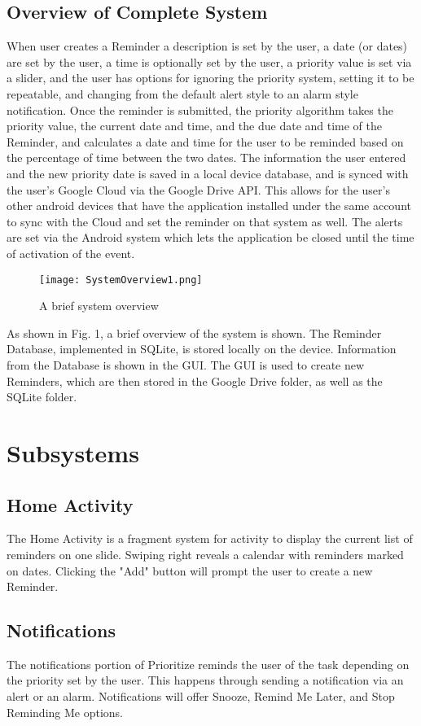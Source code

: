 \documentclass[12pt]{article}
\begin{document}
\subsection{Overview of Complete System}
When user creates a Reminder a description is set by the user, a date (or dates)  are set by the user, a time is optionally set by the user, a priority value is set via a slider, and the user has options for ignoring the priority system, setting it to be repeatable, and changing from the default alert style to an alarm style notification. Once the reminder is submitted, the priority algorithm takes the priority value, the current date and time, and the due date and time of the Reminder, and calculates a date and time for the user to be reminded based on the percentage of time between the two dates. The information the user entered and the new priority date is saved in a local device database, and is synced with the user's Google Cloud via the Google Drive API. This allows for the user's other android devices that have the application installed under the same account to sync with the Cloud and set the reminder on that system as well. The alerts are set via the Android system which lets the application be closed until the time of activation of the event.

\begin{figure}[h]
\texttt{[image: SystemOverview1.png]}
\centering
\caption{A brief system overview}
\end{figure}

As shown in Fig. 1, a brief overview of the system is shown. The Reminder Database, implemented in SQLite, is stored locally on the device. Information from the Database is shown in the GUI. The GUI is used to create new Reminders, which are then stored in the Google Drive folder, as well as the SQLite folder.

\section{Subsystems}
\subsection{Home Activity}
The Home Activity is a fragment system for activity to display the current list of reminders on one slide. Swiping right reveals a calendar with reminders marked on dates. Clicking the "Add" button will prompt the user to create a new Reminder.

\subsection{Notifications}
The notifications portion of Prioritize reminds the user of the task depending on the priority set by the user. This happens through sending a notification via an alert or an alarm.  Notifications will offer Snooze, Remind Me Later, and Stop Reminding Me options.
\end{document}
